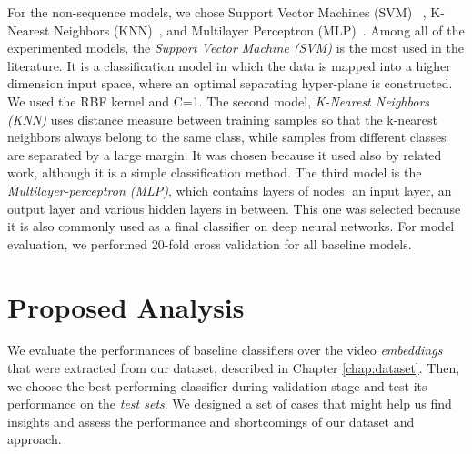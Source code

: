 For the non-sequence models, we chose Support Vector Machines (SVM)~\cite{cortes1995support} , K-Nearest Neighbors (KNN)~\cite{peterson2009k}, and Multilayer Perceptron (MLP)~\cite{haykin2009neural}.
Among all of the experimented models, the \textit{Support Vector Machine (SVM)} is the most used in the literature.
It is a classification model in which the data is mapped into a higher dimension input space, where an optimal separating hyper-plane is constructed. We used the RBF kernel and C=1.
The second model, \textit{K-Nearest Neighbors (KNN)} uses distance measure between training samples so that the k-nearest neighbors always belong to the same class, while samples from different classes are separated by a large margin. 
It was chosen because it used also by related work, although it is a simple classification method.
The third model is the \textit{Multilayer-perceptron (MLP)}, which contains layers of nodes: an input layer, an output layer and various hidden layers in between. 
This one was selected because it is also commonly used as a final classifier on deep neural networks.  
For model evaluation, we performed 20-fold cross validation for all baseline models.
%
\section{Proposed Analysis}\label{sec:experiments}

We evaluate the performances of baseline classifiers over the video \textit{embeddings} that were extracted from our dataset, described in Chapter \ref{chap:dataset}. Then, we choose the best performing classifier during validation stage and test its performance on the \textit{test sets}.  
We designed a set of cases that might help us find insights and assess the performance and shortcomings of our dataset and approach.  

